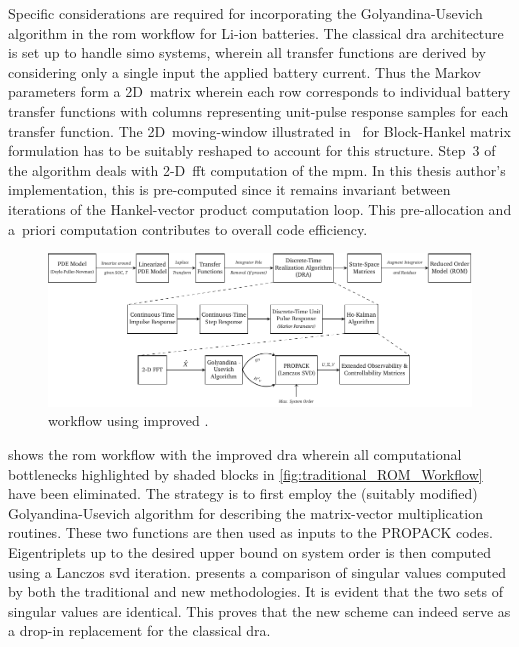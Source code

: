 Specific considerations  are required  for incorporating  the Golyandina-Usevich
algorithm  in  the  \gls{rom}  workflow  for  Li-ion  batteries.  The  classical
\gls{dra}  architecture is  set up  to  handle \gls{simo}  systems, wherein  all
transfer functions  are derived by  considering only  a single input  \viz{} the
applied battery  current. Thus  the Markov parameters  form a  2D~matrix wherein
each  row corresponds  to  individual battery  transfer  functions with  columns
representing  unit-pulse  response  samples  for  each  transfer  function.  The
2D~moving-window  illustrated in~\cite{Golyandina2015}  for Block-Hankel  matrix
formulation has to be suitably reshaped to account for this structure. Step~3 of
the  algorithm  deals  with  2-D~\gls{fft}  computation  of  the  \gls{mpm}.  In
this  thesis author's  implementation,  this is  pre-computed  since it  remains
invariant between iterations of the Hankel-vector product computation loop. This
pre-allocation and a~priori computation contributes to overall code efficiency.


\begin{figure}[!htbp]
    \centering
    \includegraphics[width=\textwidth]{new_rom.pdf}
    \caption[%
     workflow using improved 
    ]%
    {%
         workflow using improved .
    }%
    \label{fig:improved_ROM_workflow}
\end{figure}

 shows the \gls{rom}  workflow with the improved
\gls{dra} wherein all computational bottlenecks  highlighted by shaded blocks in
\cref{fig:traditional_ROM_Workflow}  have been  eliminated. The  strategy is  to
first employ the (suitably modified) Golyandina-Usevich algorithm for describing
the matrix-vector  multiplication routines.  These two  functions are  then used
as  inputs  to  the  PROPACK  codes.  Eigentriplets  up  to  the  desired  upper
bound on  system order  is then  computed using  a Lanczos  \gls{svd} iteration.
 presents a comparison of  singular values computed by both
the  traditional and  new methodologies.  It  is evident  that the  two sets  of
singular values are identical. This proves  that the new scheme can indeed serve
as a drop-in replacement for the classical \gls{dra}.

